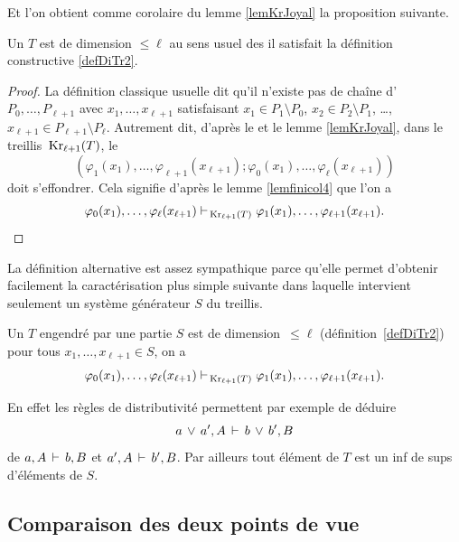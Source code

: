 Et l'on obtient comme corolaire du lemme \ref{lemKrJoyal} la proposition suivante.

\begin{proposition} \label{proplemKrJoyal} \Tcgi
 Un \trdi $T$ est de dimension $\leq \ell$ au sens usuel des \clama \ssi il satisfait la définition constructive \ref{defDiTr2}.
 \end{proposition}
%
\begin{proof}
La définition classique usuelle dit qu'il n'existe pas de chaîne d'\ideps
$P_0,\dots,P_{\ell+1}$ avec $x_1,\dots,x_{\ell+1}$ satisfaisant $x_1\in P_1\setminus P_0$, $x_2 \in P_2\setminus P_1$, \dots, $x_{\ell+1} \in P_{\ell+1}\setminus P_{\ell}$.
Autrement dit, d'après le \tcg et le lemme \ref{lemKrJoyal}, dans le treillis $\,{\rm Kr}_{\ell+1}(T)$, le \proi 
$$
(\varphi_1(x_1),\dots,\varphi_{\ell+1}(x_{\ell+1});\varphi_0(x_1),\dots,\varphi_{\ell}(x_{\ell+1}))
$$ 
doit s'effondrer. Cela signifie d'après le lemme  \ref{lemfinicol4} que
l'on a 
$$
\varphi_0(x_1),\dots,\varphi_{\ell}(x_{\ell+1})
\vdash_{\,{\rm Kr}_{\ell+1}(T)}
\varphi_1(x_1),\dots,\varphi_{\ell+1}(x_{\ell+1}).
$$
\end{proof}
%
 

La définition alternative est assez sympathique parce qu'elle permet
d'obtenir facilement la caractérisation plus simple suivante dans laquelle intervient seulement un système générateur $S$ du treillis.

\begin{lemma}
\label{lemDimGen}
Un \trdi $T$ engendré par une partie $S$ est  de dimension~$\leq \ell$
(définition~\ref{defDiTr2}) \ssi  pour tous $x_1,\dots,x_{\ell+1}\in S$, on a
$$
\varphi_0(x_1),\dots,\varphi_{\ell}(x_{\ell+1})
\vdash_{\,{\rm Kr}_{\ell+1}(T)}
\varphi_1(x_1),\dots,\varphi_{\ell+1}(x_{\ell+1}).
$$
\end{lemma}
En effet les règles de distributivité permettent par exemple de
déduire
$$ a\,\vee\, a',A\,\vdash\, b\,\vee\, b',B$$
de $a,A\,\vdash\, b,B$ et $a',A\,\vdash\, b',B$. Par ailleurs tout élément de $T$
est un inf de sups d'éléments de $S$.


\subsection{Comparaison des deux points de vue}
\label{subsubsecCompar}


